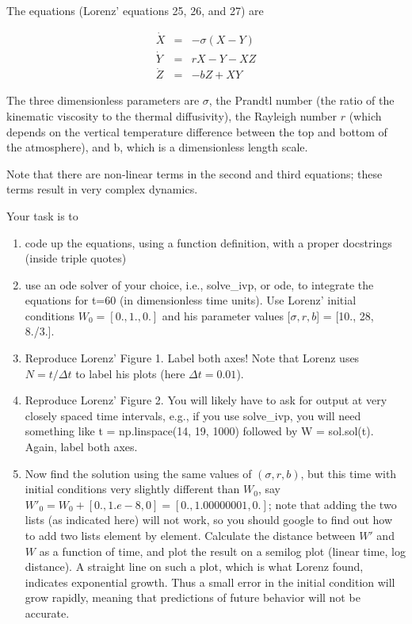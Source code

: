 \documentclass{article}
\begin{document}
The equations (Lorenz' equations 25, 26, and 27) are

\begin{eqnarray}
\dot X &=& -\sigma(X-Y)\\
\dot Y &=& rX -Y - XZ\\
\dot Z &=& -bZ + XY
\end{eqnarray}

The three dimensionless parameters are $\sigma$, the Prandtl number (the ratio of the kinematic viscosity to the thermal diffusivity), the Rayleigh number $r$ (which depends on the vertical temperature difference between the top and bottom of the atmosphere), and b, which is a dimensionless length scale.

Note that there are non-linear terms in the second and third equations;
these terms result in very complex dynamics.

Your task is to 
\begin{enumerate}
    \item code up the equations, using a function definition, with a proper docstrings (inside triple quotes)
    \item use an ode solver of your choice, i.e., solve\_ivp, or ode, to integrate the equations for t=60 (in dimensionless time units). Use Lorenz' initial conditions $W_0=[0., 1., 0.]$ and his parameter values [$\sigma, r, b$] = [10., 28, 8./3.].
    \item Reproduce Lorenz' Figure 1. Label both axes! Note that Lorenz uses $N=t/\Delta t$ to label his plots (here $\Delta t=0.01$).
    \item Reproduce Lorenz' Figure 2. You will likely have to ask for output at very closely spaced time intervals, e.g., if you use solve\_ivp, you will need something like t = np.linspace(14, 19, 1000) followed by W = sol.sol(t). Again, label both axes.
    \item Now find the solution using the same values of $(\sigma, r, b)$, but this time with initial conditions very slightly different than $W_0$, say $W'_0 = W_0+[0., 1.e-8, 0] = [0., 1.00000001, 0.]$; note that adding the two lists (as indicated here) will not work, so you should google to find out how to add two lists element by element. Calculate the distance between $W'$ and $W$ as a function of time, and plot the result on a semilog plot (linear time, log distance). A straight line on such a plot, which is what Lorenz found, indicates exponential growth. Thus a small error in the initial condition will grow rapidly, meaning that predictions of future behavior will not be accurate.
\end{enumerate}
\end{document}
